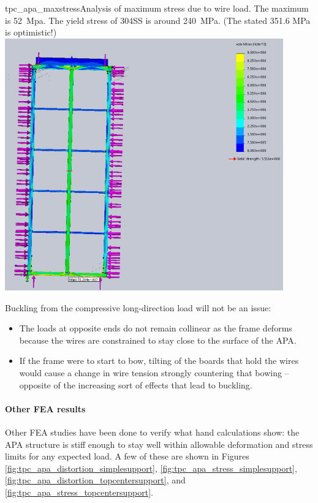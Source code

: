 \begin{cdrfigure}{tpc_apa_maxstress}{Analysis of maximum stress due to wire load.  The maximum is 52~Mpa.  The yield stress of 304SS is around 240~MPa. (The stated 351.6 MPa is optimistic!)}
\includegraphics[width=0.9\textwidth]{figures/tpc_apa_maxstress.png} 
\end{cdrfigure}

Buckling from the compressive long-direction load will not be an issue:
\begin{itemize}
\item{The loads at opposite ends do not remain collinear as the frame deforms because the wires are constrained to stay close to the surface of the APA.} 
\item{If the frame were to start to bow, tilting of the boards that hold the wires would cause a change in wire tension strongly countering that bowing -- opposite of the increasing sort of effects that lead to buckling.} 
\end{itemize}

\paragraph{Other FEA results}
Other FEA studies have been done to verify what hand calculations show: the APA structure is stiff enough to stay well within allowable deformation and stress limits for any expected load.  A few of these are shown in Figures \ref{fig:tpc_apa_distortion_simplesupport}, \ref{fig:tpc_apa_stress_simplesupport}, \ref{fig:tpc_apa_distortion_topcentersupport}, and \ref{fig:tpc_apa_stress_topcentersupport}.

